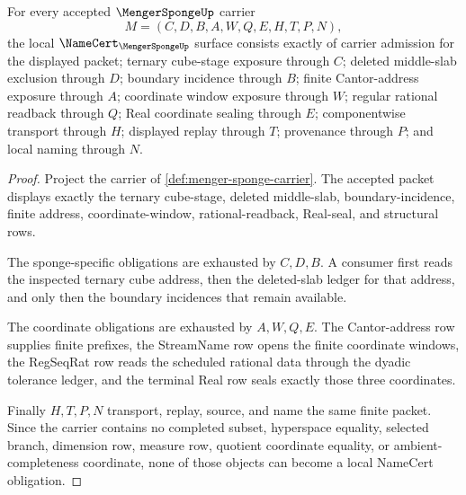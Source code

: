 \begin{theorem}
\label{thm:menger-sponge-namecert-obligations}
For every accepted $\MengerSpongeUp$ carrier
$$
M=(C,D,B,A,W,Q,E,H,T,P,N),
$$
the local $\NameCert_{\MengerSpongeUp}$ surface consists exactly of carrier admission for the displayed packet; ternary cube-stage exposure through $C$; deleted middle-slab exclusion through $D$; boundary incidence through $B$; finite Cantor-address exposure through $A$; coordinate window exposure through $W$; regular rational readback through $Q$; Real coordinate sealing through $E$; componentwise transport through $H$; displayed replay through $T$; provenance through $P$; and local naming through $N$.
\end{theorem}
\begin{proof}
Project the carrier of \autoref{def:menger-sponge-carrier}. The accepted packet displays exactly the ternary cube-stage, deleted middle-slab, boundary-incidence, finite address, coordinate-window, rational-readback, Real-seal, and structural rows.

The sponge-specific obligations are exhausted by $C,D,B$. A consumer first reads the inspected ternary cube address, then the deleted-slab ledger for that address, and only then the boundary incidences that remain available.

The coordinate obligations are exhausted by $A,W,Q,E$. The Cantor-address row supplies finite prefixes, the StreamName row opens the finite coordinate windows, the RegSeqRat row reads the scheduled rational data through the dyadic tolerance ledger, and the terminal Real row seals exactly those three coordinates.

Finally $H,T,P,N$ transport, replay, source, and name the same finite packet. Since the carrier contains no completed subset, hyperspace equality, selected branch, dimension row, measure row, quotient coordinate equality, or ambient-completeness coordinate, none of those objects can become a local NameCert obligation.
\end{proof}

